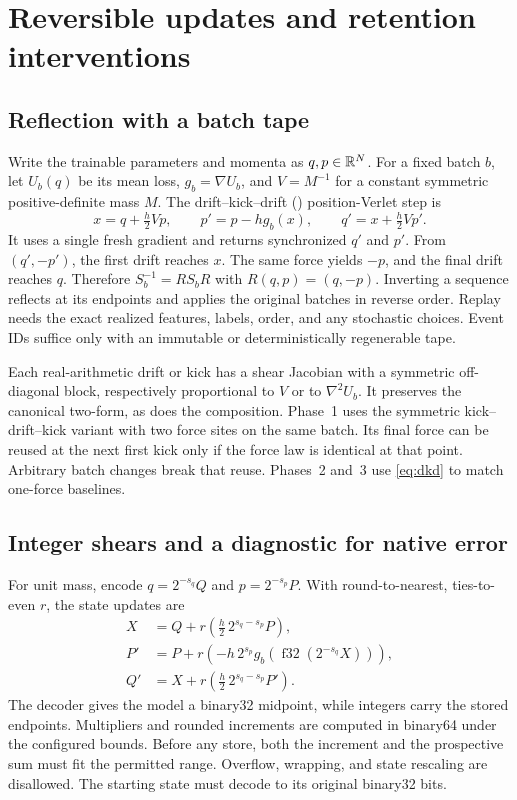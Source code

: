 \section{Reversible updates and retention interventions}
\label{sec:mechanics}

\subsection{Reflection with a batch tape}

Write the trainable parameters and momenta as \(q,p\in\mathbb{R}^N\).
For a fixed batch \(b\), let \(U_b(q)\) be its mean loss,
\(g_b=\nabla U_b\), and \(V=M^{-1}\) for a constant symmetric
positive-definite mass \(M\). The drift--kick--drift
(\DKD{}) position-Verlet step is
\begin{equation}
 x=q+\tfrac h2 Vp,\qquad p'=p-hg_b(x),\qquad
 q'=x+\tfrac h2 Vp'.
 \label{eq:dkd}
\end{equation}
It uses a single fresh gradient and returns synchronized \(q'\) and \(p'\).
From \((q',-p')\), the first drift reaches \(x\). The same force yields
\(-p\), and the final drift reaches \(q\). Therefore \(S_b^{-1}=R S_b R\)
with \(R(q,p)=(q,-p)\). Inverting a sequence reflects at its endpoints and
applies the original batches in reverse order. Replay needs the exact
realized features, labels, order, and any stochastic choices. Event IDs
suffice only with an immutable or deterministically regenerable tape.

Each real-arithmetic drift or kick has a shear Jacobian with a symmetric
off-diagonal block, respectively proportional to \(V\) or to
\(\nabla^2 U_b\). It preserves the canonical two-form, as does the
composition. Phase~1 uses the symmetric kick--drift--kick variant with
two force sites on the same batch. Its final force can be reused at the
next first kick only if the force law is identical at that point.
Arbitrary batch changes break that reuse. Phases~2 and~3 use
\eqref{eq:dkd} to match one-force baselines.

\subsection{Integer shears and a diagnostic for native error}

For unit mass, encode \(q=2^{-s_q}Q\) and \(p=2^{-s_p}P\). With
round-to-nearest, ties-to-even \(r\), the state updates are
\begin{align}
 X &= Q+r\!\left(\tfrac h2\,2^{s_q-s_p}P\right), \\
 P'&= P+r\!\left(-h\,2^{s_p}g_b(\operatorname{f32}(2^{-s_q}X))\right),\\
 Q'&= X+r\!\left(\tfrac h2\,2^{s_q-s_p}P'\right).
 \label{eq:lattice}
\end{align}
The decoder gives the model a binary32 midpoint, while integers
carry the stored endpoints. Multipliers and rounded increments are computed in
binary64 under the configured bounds. Before any store, both the
increment and the prospective sum must fit the permitted range.
Overflow, wrapping, and state rescaling are disallowed. The starting
state must decode to its original binary32 bits.

